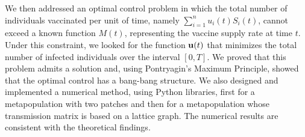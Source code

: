 \documentclass[a4paper,10pt]{article}
\theoremstyle{remark}
\begin{document}
We then addressed an optimal control problem in which the total number of individuals vaccinated per unit of time, namely $\sum_{i=1}^{n}u_i(t)S_i(t)$, cannot exceed a known function $M(t)$, representing the vaccine supply rate at time $t$. Under this constraint, we looked for the function $\bold{u}(t)$ that minimizes the total number of infected individuals over the interval $[0,T]$. We proved that this problem admits a solution and, using Pontryagin's Maximum Principle, showed that the optimal control has a bang-bang structure. We also designed and implemented a numerical method, using Python libraries, first for a metapopulation with two patches and then for a metapopulation whose transmission matrix is based on a lattice graph. The numerical results are consistent with the theoretical findings.



  
  
\end{document}
